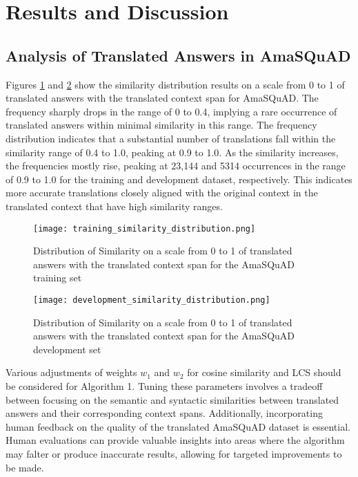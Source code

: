 \section{Results and Discussion}

\subsection{	Analysis of Translated Answers in AmaSQuAD}

Figures \ref{fig:training} and \ref{fig:development} show the similarity distribution results on a scale from 0 to 1 of translated answers with the translated context span for AmaSQuAD. The frequency sharply drops in the range of 0 to 0.4, implying a rare occurrence of translated answers within minimal similarity in this range. The frequency distribution indicates that a substantial number of translations fall within the similarity range of 0.4 to 1.0, peaking at 0.9 to 1.0. As the similarity increases, the frequencies mostly rise, peaking at 23,144 and 5314 occurrences in the range of 0.9 to 1.0 for the training and development dataset, respectively. This indicates more accurate translations closely aligned with the original context in the translated context that have high similarity ranges.

\begin{figure}[h!]
    \centering
    \texttt{[image: training\_similarity\_distribution.png]}
    \caption{Distribution of Similarity on a scale from 0 to 1 of translated answers with the translated context span for the AmaSQuAD training set}
    \label{fig:training}
\end{figure}

\begin{figure}[h!]
    \centering
    \texttt{[image: development\_similarity\_distribution.png]}
    \caption{Distribution of Similarity on a scale from 0 to 1 of translated answers with the translated context span for the AmaSQuAD development set}
    \label{fig:development}
\end{figure}

Various adjustments of weights \( w_1 \) and \( w_2 \) for cosine similarity and LCS should be considered for Algorithm 1. Tuning these parameters involves a tradeoff between focusing on the semantic and syntactic similarities between translated answers and their corresponding context spans. Additionally, incorporating human feedback on the quality of the translated AmaSQuAD dataset is essential. Human evaluations can provide valuable insights into areas where the algorithm may falter or produce inaccurate results, allowing for targeted improvements to be made.

